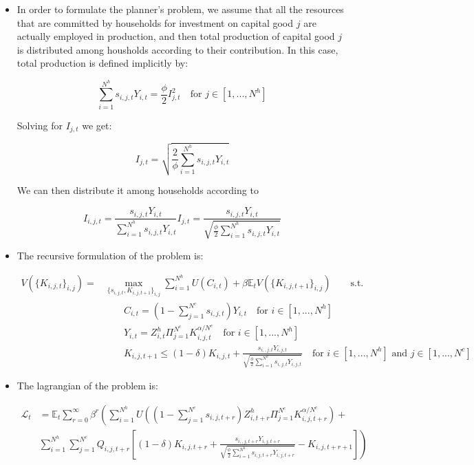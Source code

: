 \documentclass[11pt]{article}
\newcommand{\E}{\mathbb{E}}
\numberwithin{equation}{section}
\begin{document}
\begin{itemize}
	
	\item In order to formulate the planner's problem, we assume that all the resources that are committed by households for investment on capital good $j$ are actually employed in production, and then total production of capital good $j$ is distributed among housholds according to their contribution. In this case, total production is defined implicitly by:
	
	$$\sum_{i=1}^{N^h} s_{i,j,t} Y_{i,t} = \frac{\phi}{2} I_{j,t}^2 \quad \text{for } j \in [1,...,N^h]$$
	
	Solving for $I_{j,t}$ we get:
	
	$$I_{j,t} =  \sqrt{\frac{2}{\phi} \sum_{i=1}^{N^h} s_{i,j,t} Y_{i,t}}$$
	
	We can then distribute it among households according to
	
	$$I_{i,j,t} = \frac{s_{i,j,t}Y_{i,t}}{ \sum_{i=1}^{N^h} s_{i,j,t} Y_{i,t}}  I_{j,t} =   \frac{s_{i,j,t}Y_{i,t}}{\sqrt{\frac{\phi}{2} \sum_{i=1}^{N^h} s_{i,j,t} Y_{i,t}}}$$
	
	\item The recursive formulation of the problem is:
	
	
	\begin{align*}
	V\left(\{K_{i,j,t}\}_{i,j}\right) = &\max_{\{s_{i,j,t},K_{i,j,t+1}\}_{i,j}} \sum_{i=1}^{N^h} U(C_{i,t}) + \beta \E_t V(\{K_{i,j,t+1}\}_{i,j}) \qquad \text{s.t.}\\
	&\qquad
	C_{i,t} = (1-\sum_{j=1}^{N^c} s_{i,j,t})Y_{i,t} \quad \text{for } i \in [1,...,N^h]\\
	&\qquad
	Y_{i,t}=Z^h_{i,t} \Pi_{j=1}^{N^c} K_{i,j,t}^{\alpha/N^c}  \quad \text{for } i \in [1,...,N^h]\\
	&\qquad
	K_{i,j,t+1} \leq (1-\delta) K_{i,j,t} + \frac{s_{i,,j,t}Y_{i,j,t}}{\sqrt{\frac{\phi}{2} \sum_{i=1}^{N^h} s_{i,j,t} Y_{i,j,t}}}  \quad \text{for } i \in [1,...,N^h] \text{ and } j \in [1,...,N^c]
	\end{align*}
	
	
	\item The lagrangian of the problem is: 
	
	\begin{align*}
	\mathcal{L}_{t} &= \E_t \sum_{r=0}^{\infty}\beta^r  \left( \sum_{i=1}^{N^h} U\left( (1-\sum_{j=1}^{N^c} s_{i,j,t+r})Z^h_{i,t+r} \Pi_{j=1}^{N^c} K_{i,j,t+r}^{\alpha/N^c}  \right) + \right. \\
& 	\left. \sum_{i=1}^{N^h} \sum_{j=1}^{N^c}  Q_{i,j,t+r} \left[(1-\delta) K_{i,j,t+r} + \frac{s_{i,,j,t+r}Y_{i,j,t+r}}{\sqrt{\frac{\phi}{2} \sum_{i=1}^{N^h} s_{i,j,t+r} Y_{i,j,t+r}}}-K_{i,j,t+r+1}\right] \right)
	\end{align*}
	

\end{itemize}
\end{document}
